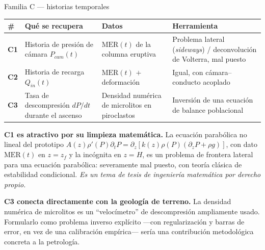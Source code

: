 \documentclass[aspectratio=169,10pt,t]{beamer}
\newcommand{\MER}{\mathrm{MER}}
\begin{document}
\begin{frame}{Familia C — historias temporales}
\footnotesize
\begin{tabular}{@{}p{}p{}p{}p{}@{}}
\toprule
\# & \textbf{Qué se recupera} & \textbf{Datos} & \textbf{Herramienta} \\
\midrule
\textbf{C1} & Historia de presión de cámara $P_{cam}(t)$ &
$\MER(t)$ de la columna eruptiva &
Problema lateral (\emph{sideways}) / deconvolución de Volterra, mal puesto \\[0.4em]
\textbf{C2} & Historia de recarga $Q_{in}(t)$ &
$\MER(t)$ $+$ deformación & Igual, con cámara–conducto acoplado \\[0.4em]
\textbf{C3} & Tasa de descompresión $dP/dt$ durante el ascenso &
Densidad numérica de microlitos en piroclastos &
Inversión de una ecuación de balance poblacional \\
\bottomrule
\end{tabular}

\vspace{0.6em}
\scriptsize
\textbf{C1 es atractivo por su limpieza matemática.} La ecuación parabólica no
lineal del prototipo
$A(z)\rho'(P)\partial_tP=\partial_z[k(z)\rho(P)(\partial_zP+\rho g)]$, con dato
$\MER(t)$ en $z=z_f$ y la incógnita en $z=H$, es un problema de frontera lateral
para una ecuación parabólica: severamente mal puesto, con teoría clásica de
estabilidad condicional. \emph{Es un tema de tesis de ingeniería matemática por
derecho propio.}

\smallskip
\textbf{C3 conecta directamente con la geología de terreno.} La densidad
numérica de microlitos es un ``velocímetro'' de descompresión ampliamente usado.
Formularlo como problema inverso explícito —con regularización y barras de
error, en vez de una calibración empírica— sería una contribución metodológica
concreta a la petrología.
\end{frame}
\end{document}
